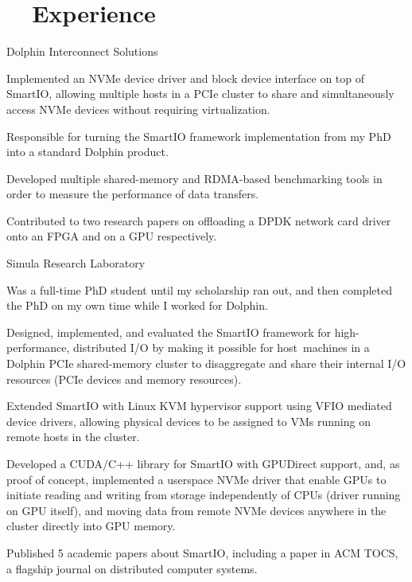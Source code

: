 \section[Experience]{\faBriefcase~~Experience}
\begin{experience}{Dolphin Interconnect Solutions}{
}
    \item{Implemented an NVMe device driver and block device interface on top of SmartIO, allowing multiple hosts in a PCIe cluster to share and simultaneously access NVMe devices without requiring virtualization.}
    \item{Responsible for turning the SmartIO framework implementation from my PhD into a standard Dolphin product.}
    \item{Developed multiple shared-memory and RDMA-based benchmarking tools in order to measure the performance of data transfers.}
    \item{Contributed to two research papers on offloading a DPDK network card driver onto an FPGA and on a GPU respectively.}
\end{experience}

\begin{experience}{Simula Research Laboratory}{
}
    \item{Was a full-time PhD student until my scholarship ran out, and then completed the PhD on my own time while I worked for Dolphin.}
    \item{Designed, implemented, and evaluated the SmartIO framework for high-performance, distributed I/O by making it possible for  host~machines in a Dolphin PCIe shared-memory cluster to disaggregate and share their internal I/O resources (PCIe devices and memory resources).}
    \item{Extended SmartIO with Linux KVM hypervisor support using VFIO mediated device drivers, allowing physical devices to be assigned to VMs running on remote hosts in the cluster.}
    \item{Developed a CUDA/C++ library for SmartIO with GPUDirect support, and, as proof of concept, implemented a userspace NVMe driver that enable GPUs to initiate reading and writing from storage independently of CPUs (driver running on GPU itself), and moving data from remote NVMe devices anywhere in the cluster directly into GPU memory.}
    \item{Published 5 academic papers about SmartIO, including a paper in ACM TOCS, a flagship journal on distributed computer systems.}
\end{experience}

